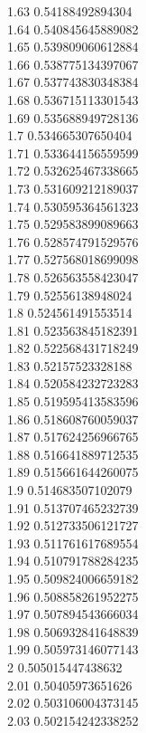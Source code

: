 {1.63	0.54188492894304\\
1.64	0.540845645889082\\
1.65	0.539809060612884\\
1.66	0.538775134397067\\
1.67	0.537743830348384\\
1.68	0.536715113301543\\
1.69	0.535688949728136\\
1.7	0.534665307650404\\
1.71	0.533644156559599\\
1.72	0.532625467338665\\
1.73	0.531609212189037\\
1.74	0.530595364561323\\
1.75	0.529583899089663\\
1.76	0.528574791529576\\
1.77	0.527568018699098\\
1.78	0.526563558423047\\
1.79	0.52556138948024\\
1.8	0.524561491553514\\
1.81	0.523563845182391\\
1.82	0.522568431718249\\
1.83	0.52157523328188\\
1.84	0.520584232723283\\
1.85	0.519595413583596\\
1.86	0.518608760059037\\
1.87	0.517624256966765\\
1.88	0.516641889712535\\
1.89	0.515661644260075\\
1.9	0.514683507102079\\
1.91	0.513707465232739\\
1.92	0.512733506121727\\
1.93	0.511761617689554\\
1.94	0.510791788284235\\
1.95	0.509824006659182\\
1.96	0.508858261952275\\
1.97	0.507894543666034\\
1.98	0.506932841648839\\
1.99	0.505973146077143\\
2	0.505015447438632\\
2.01	0.50405973651626\\
2.02	0.503106004373145\\
2.03	0.502154242338252\\
}
